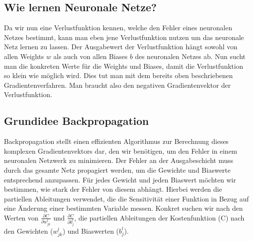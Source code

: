 \subsection{Wie lernen Neuronale Netze?}\label{subsec:backpropagation:lernen_nn}
Da wir nun eine Verlustfunktion kennen, welche den Fehler eines neuronalen Netzes bestimmt, kann man eben jene
Verlustfunktion nutzen um das neuronale Netz lernen zu lassen. Der Ausgabewert der Verlustfunktion hängt sowohl von allen Weights $w$ 
als auch von allen Biases $b$ des neuronalen Netzes ab. Nun sucht man die konkreten Werte für die Weights und Biases, damit die 
Verlustfunktion so klein wie möglich wird. Dies tut man mit dem bereits oben beschriebenen Gradientenverfahren. Man braucht also den 
negativen Gradientenvektor der Verlustfunktion.
\cite{MN19}

\subsection{Grundidee Backpropagation}\label{subsec:backpropagation:grundiee}
Backpropagation stellt einen effizienten Algorithmus zur Berechnung dieses komplexen Gradientenvektors dar, den wir benötigen, um den Fehler in einem neuronalen Netzwerk zu minimieren.
Der Fehler an der Ausgabeschicht muss durch das gesamte Netz propagiert werden, um die Gewichte und Biaswerte entsprechend anzupassen.
Für jedes Gewicht und jeden Biaswert möchten wir bestimmen, wie stark der Fehler von diesem abhängt. 
Hierbei werden die partiellen Ableitungen verwendet, die die Sensitivität einer Funktion in Bezug auf eine Änderung einer bestimmten Variable messen.
Konkret suchen wir nach den Werten von $\frac{\partial C}{\partial w_{jk}^{l}}$ und $\frac{\partial C}{\partial b_{j}^{l}}$, die partiellen Ableitungen der Kostenfunktion (C) nach den Gewichten ($w_{jk}^{l}$) und Biaswerten ($b_{j}^{l}$).
\cite{MN19}

